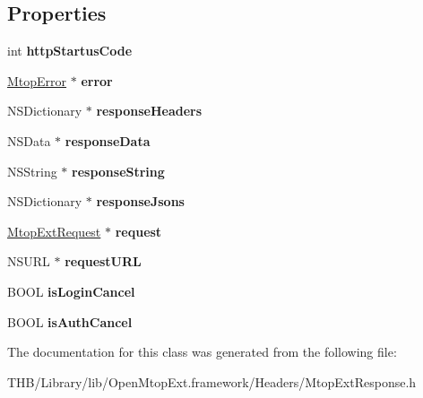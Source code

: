 \subsection*{Properties}
\begin{DoxyCompactItemize}
\item 
\mbox{\label{interface_mtop_ext_response_a4c97ef9e034722f106d580e01ad4dfde}} 
int {\bfseries http\+Startus\+Code}
\item 
\mbox{\label{interface_mtop_ext_response_a482626b30d287735bcc228258120a7c7}} 
\mbox{\hyperlink{interface_mtop_error}{Mtop\+Error}} $\ast$ {\bfseries error}
\item 
\mbox{\label{interface_mtop_ext_response_ad382ae0b9c7e5d6ebb96706aa15f119c}} 
N\+S\+Dictionary $\ast$ {\bfseries response\+Headers}
\item 
\mbox{\label{interface_mtop_ext_response_a74bbf9913f700534b47cccc16df715ad}} 
N\+S\+Data $\ast$ {\bfseries response\+Data}
\item 
\mbox{\label{interface_mtop_ext_response_aa1911b00422e51ea83a3f6719dffa7ca}} 
N\+S\+String $\ast$ {\bfseries response\+String}
\item 
\mbox{\label{interface_mtop_ext_response_aa9f2c93440d351d03c99a4b47c343152}} 
N\+S\+Dictionary $\ast$ {\bfseries response\+Jsons}
\item 
\mbox{\label{interface_mtop_ext_response_a75696ed1ff728d15462ccc6a61cca98f}} 
\mbox{\hyperlink{interface_mtop_ext_request}{Mtop\+Ext\+Request}} $\ast$ {\bfseries request}
\item 
\mbox{\label{interface_mtop_ext_response_ab615705496404b7e3001bec28016e4d9}} 
N\+S\+U\+RL $\ast$ {\bfseries request\+U\+RL}
\item 
\mbox{\label{interface_mtop_ext_response_ae97eeabfdabeb33599cf7905dd225d3b}} 
B\+O\+OL {\bfseries is\+Login\+Cancel}
\item 
\mbox{\label{interface_mtop_ext_response_ab55e61a1e6894dd1321099bb86ca76de}} 
B\+O\+OL {\bfseries is\+Auth\+Cancel}
\end{DoxyCompactItemize}


The documentation for this class was generated from the following file\+:\begin{DoxyCompactItemize}
\item 
T\+H\+B/\+Library/lib/\+Open\+Mtop\+Ext.\+framework/\+Headers/Mtop\+Ext\+Response.\+h\end{DoxyCompactItemize}
